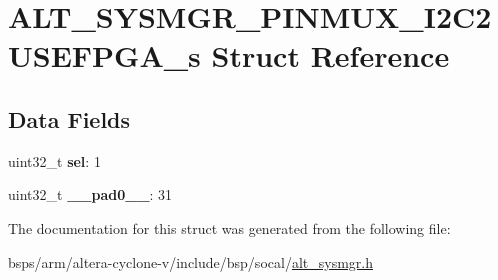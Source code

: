 \hypertarget{structALT__SYSMGR__PINMUX__I2C2USEFPGA__s}{}\section{A\+L\+T\+\_\+\+S\+Y\+S\+M\+G\+R\+\_\+\+P\+I\+N\+M\+U\+X\+\_\+\+I2\+C2\+U\+S\+E\+F\+P\+G\+A\+\_\+s Struct Reference}
\label{structALT__SYSMGR__PINMUX__I2C2USEFPGA__s}
\subsection*{Data Fields}
\begin{DoxyCompactItemize}
\item 
\mbox{\label{structALT__SYSMGR__PINMUX__I2C2USEFPGA__s_a91c988b23421b1de47bff58dfbd4be6d}} 
uint32\+\_\+t {\bfseries sel}\+: 1
\item 
\mbox{\label{structALT__SYSMGR__PINMUX__I2C2USEFPGA__s_a53698670e392e1860b7a9981a093ff88}} 
uint32\+\_\+t {\bfseries \+\_\+\+\_\+pad0\+\_\+\+\_\+}\+: 31
\end{DoxyCompactItemize}


The documentation for this struct was generated from the following file\+:\begin{DoxyCompactItemize}
\item 
bsps/arm/altera-\/cyclone-\/v/include/bsp/socal/\mbox{\hyperlink{alt__sysmgr_8h}{alt\+\_\+sysmgr.\+h}}\end{DoxyCompactItemize}
